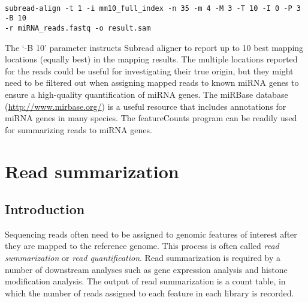 \documentclass[12pt]{report}
\newcommand{\code}[1]{{\small\texttt{#1}}}
\newcommand{\Subread}{\textsf{Subread}}
\newcommand{\featureCounts}{\textsf{featureCounts}}
\begin{document}
\code{\\
subread-align -t 1 -i mm10\_full\_index -n 35 -m 4 -M 3 -T 10 -I 0 -P 3 -B 10 \\
-r miRNA\_reads.fastq -o result.sam\\
}

The `-B 10' parameter instructs {\Subread} aligner to report up to 10 best mapping locations (equally best) in the mapping results.
The multiple locations reported for the reads could be useful for investigating their true origin, but they might need to be filtered out when assigning mapped reads to known miRNA genes to ensure a high-quality quantification of miRNA genes.
The miRBase database (\url{http://www.mirbase.org/}) is a useful resource that includes annotations for miRNA genes in many species.
The {\featureCounts} program can be readily used for summarizing reads to miRNA genes.



\chapter{Read summarization}

\section{Introduction}

Sequencing reads often need to be assigned to genomic features of interest after they are mapped to the reference genome.
This process is often called \emph{read summarization} or \emph{read quantification}.
Read summarization is required by a number of downstream analyses such as gene expression analysis and histone modification analysis.
The output of read summarization is a count table, in which the number of reads assigned to each feature in each library is recorded.
\end{document}
